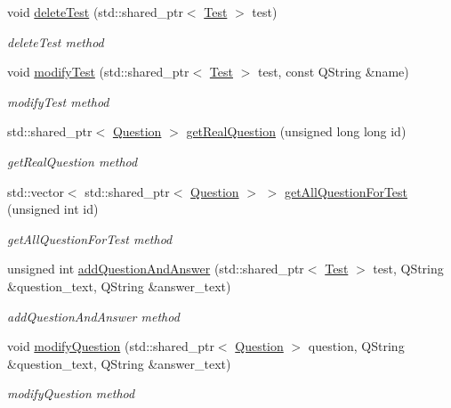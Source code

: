 \begin{DoxyCompactItemize}
void \hyperlink{class_db_manager_aad9f028c4b4754b1ac8fc133b0030b8e}{delete\+Test} (std\+::shared\+\_\+ptr$<$ \hyperlink{class_test}{Test} $>$ test)
\begin{DoxyCompactList}\small\item\em delete\+Test method \end{DoxyCompactList}\item 
void \hyperlink{class_db_manager_a120137937bb81cd95b4445433b4ededc}{modify\+Test} (std\+::shared\+\_\+ptr$<$ \hyperlink{class_test}{Test} $>$ test, const Q\+String \&name)
\begin{DoxyCompactList}\small\item\em modify\+Test method \end{DoxyCompactList}\item 
std\+::shared\+\_\+ptr$<$ \hyperlink{class_question}{Question} $>$ \hyperlink{class_db_manager_ac703dfee1ede761a035076bdda1afb3a}{get\+Real\+Question} (unsigned long long id)
\begin{DoxyCompactList}\small\item\em get\+Real\+Question method \end{DoxyCompactList}\item 
std\+::vector$<$ std\+::shared\+\_\+ptr$<$ \hyperlink{class_question}{Question} $>$ $>$ \hyperlink{class_db_manager_a1b47ae876255a8aaee2d0cced76c83ab}{get\+All\+Question\+For\+Test} (unsigned int id)
\begin{DoxyCompactList}\small\item\em get\+All\+Question\+For\+Test method \end{DoxyCompactList}\item 
unsigned int \hyperlink{class_db_manager_aeae72a2221c4e01b1e6af1d5fef2facd}{add\+Question\+And\+Answer} (std\+::shared\+\_\+ptr$<$ \hyperlink{class_test}{Test} $>$ test, Q\+String \&question\+\_\+text, Q\+String \&answer\+\_\+text)
\begin{DoxyCompactList}\small\item\em add\+Question\+And\+Answer method \end{DoxyCompactList}\item 
void \hyperlink{class_db_manager_aebcb87dba40f623d380310141714e837}{modify\+Question} (std\+::shared\+\_\+ptr$<$ \hyperlink{class_question}{Question} $>$ question, Q\+String \&question\+\_\+text, Q\+String \&answer\+\_\+text)
\begin{DoxyCompactList}\small\item\em modify\+Question method \end{DoxyCompactList}\item 

\end{DoxyCompactItemize}
